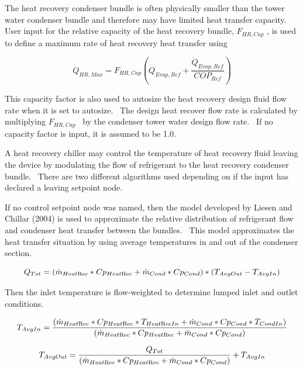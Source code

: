 The heat recovery condenser bundle is often physically smaller than the tower water condenser bundle and therefore may have limited heat transfer capacity.~ User input for the relative capacity of the heat recovery bundle, \({F_{HR,Cap}}\) , is used to define a maximum rate of heat recovery heat transfer using

\begin{equation}
{\dot Q_{HR,Max}} = {F_{HR,Cap}}\left( {{{\dot Q}_{Evap,Ref}} + \frac{{{{\dot Q}_{Evap,Ref}}}}{{CO{P_{Ref}}}}} \right)
\end{equation}

This capacity factor is also used to autosize the heat recovery design fluid flow rate when it is set to autosize.~ The design heat recover flow rate is calculated by multiplying \({F_{HR,Cap}}\) ~by the condenser tower water design flow rate.~ If no capacity factor is input, it is assumed to be 1.0.

A heat recovery chiller may control the temperature of heat recovery fluid leaving the device by modulating the flow of refrigerant to the heat recovery condenser bundle.~ There are two different algorithms used depending on if the input has declared a leaving setpoint node.

If no control setpoint node was named, then the model developed by Liesen and Chillar (2004) is used to approximate the relative distribution of refrigerant flow and condenser heat transfer between the bundles.~ This model approximates the heat transfer situation by using average temperatures in and out of the condenser section.

\begin{equation}
{Q_{Tot}} = ({\dot m_{Heat{\mathop{\rm Re}\nolimits} c}}*C{p_{Heat{\mathop{\rm Re}\nolimits} c}} + {\dot m_{Cond}}*C{p_{Cond}})*({T_{AvgOut}} - {T_{AvgIn}})
\end{equation}

Then the inlet temperature is flow-weighted to determine lumped inlet and outlet conditions.

\begin{equation}
{T_{AvgIn}} = \frac{{({{\dot m}_{Heat{\mathop{\rm Re}\nolimits} c}}*C{p_{Heat{\mathop{\rm Re}\nolimits} c}}*{T_{Heat{\mathop{\rm Re}\nolimits} cIn}} + {{\dot m}_{Cond}}*C{p_{Cond}}*{T_{CondIn}})}}{{({{\dot m}_{Heat{\mathop{\rm Re}\nolimits} c}}*C{p_{Heat{\mathop{\rm Re}\nolimits} c}} + {{\dot m}_{Cond}}*C{p_{Cond}})}}
\end{equation}

\begin{equation}
{T_{AvgOut}} = \frac{{{Q_{Tot}}}}{{({{\dot m}_{Heat{\mathop{\rm Re}\nolimits} c}}*C{p_{Heat{\mathop{\rm Re}\nolimits} c}} + {{\dot m}_{Cond}}*C{p_{Cond}})}} + {T_{AvgIn}}
\end{equation}

